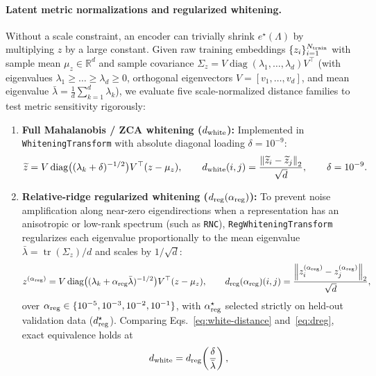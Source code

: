 \documentclass[preprint,11pt,a4paper]{elsarticle}
\newcommand{\R}{\mathbb{R}}
\newcommand{\norm}[1]{\left\lVert #1\right\rVert}
\begin{document}
\paragraph{Latent metric normalizations and regularized whitening.}
Without a scale constraint, an encoder can trivially shrink $e^\star(\Lambda)$ by multiplying $z$ by a large constant. Given raw training embeddings $\{z_i\}_{i=1}^{N_{\rm train}}$ with sample mean $\mu_z\in\R^d$ and sample covariance $\Sigma_z = V\operatorname{diag}(\lambda_1,\dots,\lambda_d)V^\top$ (with eigenvalues $\lambda_1\ge\dots\ge\lambda_d\ge 0$, orthogonal eigenvectors $V=[v_1,\dots,v_d]$, and mean eigenvalue $\bar\lambda=\frac1d\sum_{k=1}^d\lambda_k$), we evaluate five scale-normalized distance families to test metric sensitivity rigorously:
\begin{enumerate}
    \item \textbf{Full Mahalanobis / ZCA whitening ($d_{\rm white}$):} Implemented in \texttt{WhiteningTransform} with absolute diagonal loading $\delta=10^{-9}$:
    \begin{equation}
    \widetilde z = V\operatorname{diag}\!\big((\lambda_k+\delta)^{-1/2}\big)V^\top(z-\mu_z),\qquad
    d_{\rm white}(i,j)=\frac{\norm{\widetilde z_i-\widetilde z_j}_2}{\sqrt d},
    \qquad \delta=10^{-9}.
    \label{eq:white-distance}
    \end{equation}
    \item \textbf{Relative-ridge regularized whitening ($d_{\rm reg}(\alpha_{\rm reg})$):} To prevent noise amplification along near-zero eigendirections when a representation has an anisotropic or low-rank spectrum (such as \texttt{RNC}), \texttt{RegWhiteningTransform} regularizes each eigenvalue proportionally to the mean eigenvalue $\bar\lambda=\operatorname{tr}(\Sigma_z)/d$ and scales by $1/\sqrt d$:
    \begin{equation}
    z^{(\alpha_{\rm reg})} = V\operatorname{diag}\!\big((\lambda_k + \alpha_{\rm reg}\bar\lambda)^{-1/2}\big)V^\top(z-\mu_z),
    \qquad
    d_{\rm reg}(\alpha_{\rm reg})(i,j)=\frac{\norm{z_i^{(\alpha_{\rm reg})}-z_j^{(\alpha_{\rm reg})}}_2}{\sqrt d},
    \label{eq:dreg}
    \end{equation}
    over $\alpha_{\rm reg}\in\{10^{-5}, 10^{-3}, 10^{-2}, 10^{-1}\}$, with $\alpha_{\rm reg}^\star$ selected strictly on held-out validation data ($d_{\rm reg}^\star$). Comparing Eqs.~\eqref{eq:white-distance} and~\eqref{eq:dreg}, exact equivalence holds at
    \begin{equation}
    d_{\rm white} = d_{\rm reg}\!\left(\frac{\delta}{\bar\lambda}\right),

\end{equation}
\end{enumerate}
\end{document}
